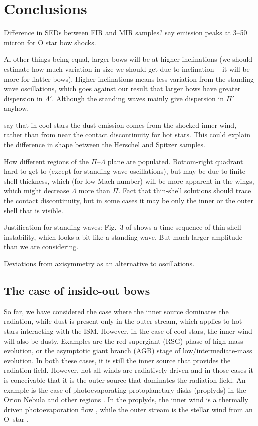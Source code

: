 
\section{Conclusions}
\label{sec:conclusion}

Difference in SEDs between FIR and MIR samples?  \citet{Meyer:2016a}
say emission peaks at 3--50 micron for O star bow shocks.

Al other things being equal, larger bows will be at higher
inclinations (we should estimate how much variation in size we should
get due to inclination -- it will be more for flatter bows).  Higher
inclinations means less variation from the standing wave oscillations,
which goes against our result that larger bows have greater dispersion
in \(\Lambda'\).  Although the standing waves mainly give dispersion in
\(\Pi'\) anyhow.

\citet{Meyer:2014a} say that in cool stars the dust emission comes
from the shocked inner wind, rather than from near the contact
discontinuity for hot stars.  This could explain the difference in
shape between the Herschel and Spitzer samples.


How different regions of the \(\Pi\)--\(\Lambda\) plane are populated.
Bottom-right quadrant hard to get to (except for standing wave
oscillations), but may be due to finite shell thickness, which (for
low Mach number) will be more apparent in the wings, which might
decrease \(\Lambda\) more than \(\Pi\).  Fact that thin-shell solutions should
trace the contact discontinuity, but in some cases it may be only the
inner or the outer shell that is visible.

Justification for standing waves: Fig.~3 of \citet{Meyer:2016a} shows
a time sequence of thin-shell instability, which looks a bit like a
standing wave. But much larger amplitude than we are considering.

Deviations from axisymmetry as an alternative to oscillations. 

\subsection{The case of inside-out bows}
\label{sec:case-inside-out}

So far, we have considered the case where the inner source dominates
the radiation, while dust is present only in the outer stream, which
applies to hot stars interacting with the ISM.  However, in the case
of cool stars, the inner wind will also be dusty.  Examples are the
red supergiant (RSG) phase of high-mass evolution, or the asymptotic
giant branch (AGB) stage of low/intermediate-mass evolution.  In both
these cases, it is still the inner source that provides the radiation
field.  However, not all winds are radiatively driven and in those
cases it is conceivable that it is the outer source that dominates the
radiation field.  An example is the case of photoevaporating
protoplanetary disks (proplyds) in the Orion Nebula and other \hii{}
regions \citep{ODell:1994a}.  In the proplyds, the inner wind is a
thermally driven photoevaporation flow \citep{Henney:1998b, Henney:1999a},
while the outer stream is the stellar wind from an O~star
\citep{Garcia-Arredondo:2001a}.


